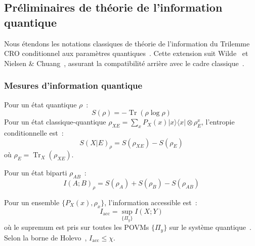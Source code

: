 \subsection{Pr\'eliminaires de th\'eorie de l'information quantique}
\label{subsec:preliminaires_quantiques}
\begin{sloppypar}
Nous \'etendons les notations classiques de th\'eorie de l'information du
Trilemme CRO conditionnel aux param\`etres quantiques~\cite{MINKA2026CRO,Fano61,Pinsker1964}.
Cette extension suit Wilde~\cite{Wilde2017} et Nielsen \& Chuang~\cite{NielsenChuang2010},
assurant la compatibilit\'e arri\`ere avec le cadre classique~\cite{Shannon48,CoverThomas06}.

\subsubsection{Mesures d'information quantique}
\label{subsubsec:mesures_info_quantique}

\begin{definition}\label{def:entropie_conditionnelle_quantique}
Pour un \'etat quantique $\rho$~:
\begin{equation}
S(\rho) = -\operatorname{Tr}(\rho \log \rho)
\end{equation}
Pour un \'etat classique-quantique $\rho_{XE} = \sum_x P_X(x) |x\rangle\langle x|
\otimes \rho_E^x$, l'entropie conditionnelle est~:
\begin{equation}
S(X|E)_\rho = S(\rho_{XE}) - S(\rho_E)
\end{equation}
o\`u $\rho_E = \operatorname{Tr}_X(\rho_{XE})$.
\end{definition}

\begin{definition}\label{def:information_mutuelle_quantique}
Pour un \'etat biparti $\rho_{AB}$~:
\begin{equation}
I(A; B)_\rho = S(\rho_A) + S(\rho_B) - S(\rho_{AB})
\end{equation}
\end{definition}

\begin{definition}\label{def:info_accessible}
Pour un ensemble $\{P_X(x), \rho_x\}$, l'information accessible est~:
\begin{equation}
I_{\mathrm{acc}} = \sup_{\{\Pi_y\}} I(X; Y)
\end{equation}
o\`u le supremum est pris sur toutes les POVMs $\{\Pi_y\}$ sur le syst\`eme
quantique~\cite{NielsenChuang2010}. Selon la borne de Holevo~\cite{Holevo1973},
$I_{\mathrm{acc}} \leq \chi$.
\end{definition}


\end{sloppypar}

